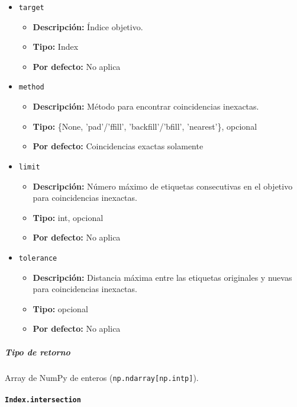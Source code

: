 \begin{itemize}
    \item \texttt{target}
          \begin{itemize}
              \item \textbf{Descripción:} Índice objetivo.
              \item \textbf{Tipo:} Index
              \item \textbf{Por defecto:} No aplica
          \end{itemize}
    \item \texttt{method}
          \begin{itemize}
              \item \textbf{Descripción:} Método para encontrar coincidencias
                    inexactas.
              \item \textbf{Tipo:} \{None, 'pad'/'ffill', 'backfill'/'bfill',
                    'nearest'\}, opcional
              \item \textbf{Por defecto:} Coincidencias exactas solamente
          \end{itemize}
    \item \texttt{limit}
          \begin{itemize}
              \item \textbf{Descripción:} Número máximo de etiquetas
                    consecutivas en el objetivo para coincidencias inexactas.
              \item \textbf{Tipo:} int, opcional
              \item \textbf{Por defecto:} No aplica
          \end{itemize}
    \item \texttt{tolerance}
          \begin{itemize}
              \item \textbf{Descripción:} Distancia máxima entre las etiquetas
                    originales y nuevas para coincidencias inexactas.
              \item \textbf{Tipo:} opcional
              \item \textbf{Por defecto:} No aplica
          \end{itemize}
\end{itemize}

\subparagraph{Tipo de retorno}
Array de NumPy de enteros (\texttt{np.ndarray[np.intp]}).

\paragraph{\texttt{Index.intersection}}

